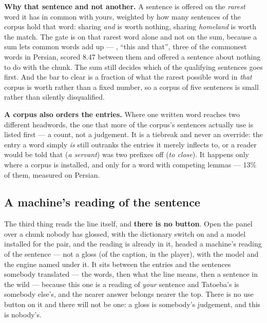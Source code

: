 \documentclass[11pt,oneside]{report}
\newcommand{\pw}[1]{\babelsublr{\mbox{\foreignlanguage{persian}{#1}}}}
\newcommand{\menu}[1]{\textsf{#1}}
\begin{document}
\begin{goodbox}
\textbf{Why that sentence and not another.} A sentence is offered on the
\emph{rarest} word it has in common with yours, weighted by how many
sentences of the corpus hold that word: sharing \emph{and} is worth nothing,
sharing \emph{homeland} is worth the match. The gate is on that rarest word
alone and not on the sum, because a sum lets common words add up ---
\pw{این و آن}, ``this and that'', three of the commonest words in Persian,
scored 8.47 between them and offered a sentence about nothing to do with the
chunk. The sum still decides which of the qualifying sentences goes first.
And the bar to clear is a fraction of what the rarest possible word in
\emph{that} corpus is worth rather than a fixed number, so a corpus of five
sentences is small rather than silently disqualified.
\end{goodbox}

\begin{goodbox}
\textbf{A corpus also orders the entries.} Where one written word reaches two
different headwords, the one that more of the corpus's sentences actually use
is listed first --- a count, not a judgement. It is a tiebreak and never an
override: the entry a word simply \emph{is} still outranks the entries it
merely inflects to, or a reader would be told that \pw{بنده} (\emph{a
servant}) was two prefixes off \pw{بستن} (\emph{to close}). It happens only
where a corpus is installed, and only for a word with competing lemmas ---
13\% of them, measured on Persian.
\end{goodbox}

\subsection*{A machine's reading of the sentence}

The third thing reads the line itself, and \textbf{there is no button}. Open
the panel over a chunk nobody has glossed, with the \menu{dictionary} switch
on and a model installed for the pair, and the reading is already in it,
headed \menu{a machine's reading of the sentence --- not a gloss} (\menu{of
the caption}, in the player), with the model and the engine named under it.
It sits between the entries and the sentences somebody translated --- the
words, then what the line means, then a sentence in the wild --- because
this one is a reading of \emph{your} sentence and Tatoeba's is somebody
else's, and the nearer answer belongs nearer the top. There is no \menu{use}
button on it and there will not be one: a gloss is somebody's judgement, and
this is nobody's.
\end{document}
